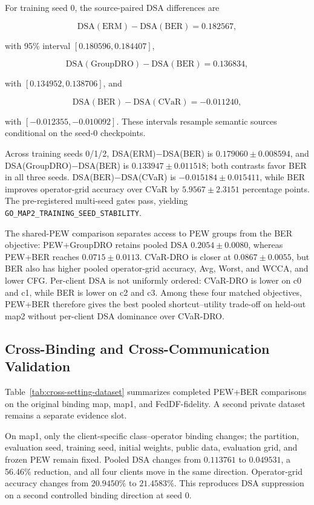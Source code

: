 

For training seed 0, the source-paired DSA differences are

\[
\mathrm{DSA(ERM)}-\mathrm{DSA(BER)}=0.182567,
\]

with 95\% interval \([0.180596,0.184407]\),

\[
\mathrm{DSA(GroupDRO)}-\mathrm{DSA(BER)}=0.136834,
\]

with \([0.134952,0.138706]\), and

\[
\mathrm{DSA(BER)}-\mathrm{DSA(CVaR)}=-0.011240,
\]

with \([-0.012355,-0.010092]\). These intervals resample semantic sources conditional on the seed-0 checkpoints.

Across training seeds 0/1/2, DSA(ERM)$-$DSA(BER) is \(0.179060\pm0.008594\), and DSA(GroupDRO)$-$DSA(BER) is \(0.133947\pm0.011518\); both contrasts favor BER in all three seeds. DSA(BER)$-$DSA(CVaR) is \(-0.015184\pm0.015411\), while BER improves operator-grid accuracy over CVaR by \(5.9567\pm2.3151\) percentage points. The pre-registered multi-seed gates pass, yielding \texttt{GO\_MAP2\_TRAINING\_SEED\_STABILITY}.

The shared-PEW comparison separates access to PEW groups from the BER objective: PEW+GroupDRO retains pooled DSA \(0.2054\pm0.0080\), whereas PEW+BER reaches \(0.0715\pm0.0113\). CVaR-DRO is closer at \(0.0867\pm0.0055\), but BER also has higher pooled operator-grid accuracy, Avg, Worst, and WCCA, and lower CFG. Per-client DSA is not uniformly ordered: CVaR-DRO is lower on c0 and c1, while BER is lower on c2 and c3. Among these four matched objectives, PEW+BER therefore gives the best pooled shortcut--utility trade-off on held-out map2 without per-client DSA dominance over CVaR-DRO.

\subsection{Cross-Binding and Cross-Communication Validation}

Table~\ref{tab:cross-setting-dataset} summarizes completed PEW+BER comparisons on the original binding map, map1, and FedDF-fidelity. A second private dataset remains a separate evidence slot.



On map1, only the client-specific class--operator binding changes; the partition, evaluation seed, training seed, initial weights, public data, evaluation grid, and frozen PEW remain fixed. Pooled DSA changes from \(0.113761\) to \(0.049531\), a 56.46\% reduction, and all four clients move in the same direction. Operator-grid accuracy changes from \(20.9450\%\) to \(21.4583\%\). This reproduces DSA suppression on a second controlled binding direction at seed 0.

